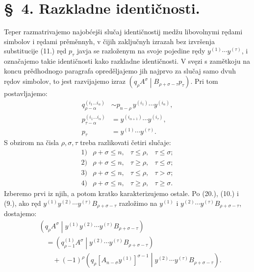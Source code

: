 \documentclass[11pt]{article}
\newcommand{\pair}[2]{\left(#1\middle|#2\right)}
\begin{document}
\section*{\S\ 4. Razkladne identičnosti.}

Teper razmatrivajemo najobćejši slučaj identičnostij medžu libovolnymi rędami simbolov i rędami prěměnnyh, v čijih zaključnyh izrazah bez izvršenja substitucije (11.) ręd $p_\tau$ javja se razloženym na svoje pojedine rędy $y^{(1)}\cdots y^{(\tau)}$, i označajemo takie identičnosti kako razkladne identičnosti. V svęzi s zamětkoju na koncu prědhodnogo paragrafa opreděljajemo jih najprvo za slučaj samo dvuh rędov simbolov, to jest razvijajemo izraz $\pair{q_\rho A^\sigma}{B_{\rho+\sigma-\tau}p_\tau}$. Pri tom postavljajemo:
\begin{equation}
\begin{aligned}
q_{\rho-\alpha}^{(i_1\ldots i_\alpha)}
&\sim p_{n-\rho}\,y^{(i_1)}\cdots y^{(i_\alpha)},\\
p_{\tau-\alpha}^{(i_1\ldots i_\alpha)}
&=y^{(i_{\alpha+1})}\cdots y^{(i_\tau)},\\
p_\tau&=y^{(1)}\cdots y^{(\tau)}.
\end{aligned}
\tag{22}
\end{equation}
S obzirom na čisla $\rho,\sigma,\tau$ treba razlikovati četiri slučaje:
\[
\begin{array}{llll}
1)&\rho+\sigma\le n,& \tau\le\rho,& \tau\le\sigma;\\[2pt]
2)&\rho+\sigma\le n,& \tau\ge\rho,& \tau\le\sigma;\\[2pt]
3)&\rho+\sigma\le n,& \tau\le\rho,& \tau>\sigma;\\[2pt]
4)&\rho+\sigma\le n,& \tau\ge\rho,& \tau\ge\sigma.
\end{array}
\]
Izberemo prvi iz njih, a potom kratko karakterizujemo ostale. Po (20.), (10.) i (9.), ako ręd $y^{(1)}y^{(2)}\cdots y^{(\tau)}B_{\rho+\sigma-\tau}$ razložimo na $y^{(1)}$ i $y^{(2)}\cdots y^{(\tau)}B_{\rho+\sigma-\tau}$, dostajemo:
\begin{equation}
\begin{aligned}
&\pair{q_\rho A^\sigma}{y^{(1)}y^{(2)}\cdots y^{(\tau)}
B_{\rho+\sigma-\tau}}\\
&\quad=\pair{q_{\rho-1}^{(1)}A^\sigma}
{y^{(2)}\cdots y^{(\tau)}B_{\rho+\sigma-\tau}}\\
&\qquad+(-1)^\rho
\pair{q_\rho[A_{n-\sigma}y^{(1)}]^{\sigma-1}}
{y^{(2)}\cdots y^{(\tau)}B_{\rho+\sigma-\tau}}.
\end{aligned}
\tag{23}
\end{equation}
\end{document}

